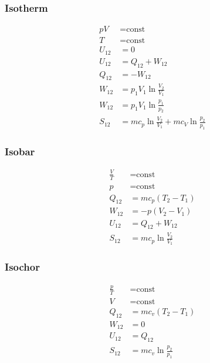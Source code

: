 \begin{multicols}{2}
\subsubsection*{Isotherm}
\begin{align*}
pV&=\text{const}\\
T&=\text{const}\\
U_{12}&=0\\
U_{12}&=Q_{12}+ W_{12}\\
Q_{12}&=-W_{12}\\
W_{12}&=p_1V_1\ln{\frac{V_2}{V_1}}\\
W_{12}&=p_1V_1\ln{\frac{p_1}{p_2}}\\
S_{12}&=mc_p\ln{\frac{V_2}{V_1}}+mc_V\ln{\frac{p_2}{p_1}}
\end{align*}

\subsubsection*{Isobar}
\begin{align*}
\frac{V}{T}&=\text{const}\\
p&=\text{const}\\
Q_{12}&=mc_p\left(T_2-T_1\right)\\
W_{12}&=-p\left(V_2-V_1\right)\\
U_{12}&=Q_{12}+ W_{12}\\
S_{12}&=mc_p\ln{\frac{V_2}{V_1}}
\end{align*}

\subsubsection*{Isochor}
\begin{align*}
\frac{p}{T}&=\text{const}\\
V&=\text{const}\\
Q_{12}&=mc_v\left(T_2-T_1\right)\\
W_{12}&=0\\
U_{12}&=Q_{12}\\
S_{12}&=mc_v\ln{\frac{p_2}{p_1}}
\end{align*}


\end{multicols}
